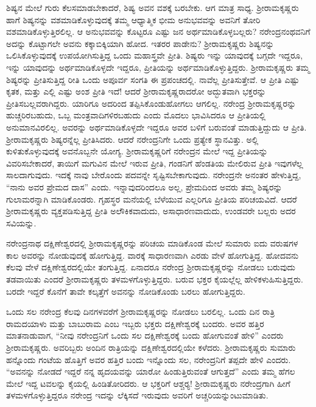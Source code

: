 ಶಿಷ್ಯನ ಮೇಲೆ ಗುರು ಕೆಲಸಮಾಡಬೇಕಾದರೆ, ಶಿಷ್ಯ ಅವನ ವಶಕ್ಕೆ ಬರಬೇಕು. ಆಗ ಮಾತ್ರ ಸಾಧ್ಯ. ಶ‍್ರೀರಾಮಕೃಷ್ಣರು ಹಾಗೆ ಶಿಷ್ಯನನ್ನು ವಶಮಾಡಿಕೊಳ್ಳುವುದಕ್ಕೆ ತಮ್ಮ ಆಧ್ಯಾತ್ಮಿಕ ಭೀಮ ಅನುಭವವನ್ನು ಅವನಿಗೆ ತೋರಿ ವಶಮಾಡಿಕೊಳ್ಳುತ್ತಿರಲಿಲ್ಲ. ಆ ಅನುಭವವನ್ನು ಕೊಟ್ಟರೂ ಎಷ್ಟು ಜನ ಅರ್ಥಮಾಡಿಕೊಳ್ಳಬಲ್ಲರು? ನರೇಂದ್ರನಂಥವನಿಗೆ ಅದನ್ನು ಕೊಟ್ಟಾಗಲೇ ಅವನು ಕಕ್ಕಾಬಿಕ್ಕಿಯಾಗಿ ಹೋದ. ಇತರರ ಪಾಡೇನು? ಶ‍್ರೀರಾಮಕೃಷ್ಣರು ಶಿಷ್ಯನನ್ನು ಒಲಿಸಿಕೊಳ್ಳುವುದಕ್ಕೆ ಉಪಯೋಗಿಸುತ್ತಿದ್ದ ಒಂದು ಮಹಾಸ್ತ್ರವೇ ಪ್ರೀತಿ. ಶಿಷ್ಯರು ಇನ್ನು ಯಾವುದಕ್ಕೆ ಬಗ್ಗದೇ ಇದ್ದರೂ, ಇನ್ನು ಯಾವುದನ್ನು ಅರ್ಥಮಾಡಿಕೊಳ್ಳದೇ ಇದ್ದರೂ, ಪ್ರೀತಿಯನ್ನು ಅರ್ಥಮಾಡಿಕೊಳ್ಳುತ್ತಿದ್ದರು. ಶ‍್ರೀರಾಮಕೃಷ್ಣರು ತಮ್ಮ ಶಿಷ್ಯರನ್ನು ಪ್ರೀತಿಸುತ್ತಿದ್ದ ರೀತಿ ಒಂದು ಅಪೂರ್ವ ಸಂಗತಿ ಈ ಪ್ರಪಂಚದಲ್ಲಿ. ನಾವೆಲ್ಲ ಪ್ರೀತಿಸುತ್ತೇವೆ. ಆ ಪ್ರೀತಿ ಎಷ್ಟು ಕೃತಕ, ಮತ್ತು ಎಲ್ಲಿ ಎಷ್ಟು ಅಂಶ ಪ್ರೀತಿ ಇದೆ! ಆದರೆ ಶ‍್ರೀರಾಮಕೃಷ್ಣರಾದರೋ ಅದ್ಭುತವಾಗಿ ಭಕ್ತರನ್ನು ಪ್ರೀತಿಸಬಲ್ಲವರಾಗಿದ್ದರು. ಯಾರಿಗೂ ಅದರಿಂದ ತಪ್ಪಿಸಿಕೊಂಡುಹೋಗಲು ಆಗಲಿಲ್ಲ. ನರೇಂದ್ರ ಶ‍್ರೀರಾಮಕೃಷ್ಣರನ್ನು ಹುಚ್ಚರಿರಬಹುದು, ಒಬ್ಬ ಮಂತ್ರವಾದಿಗಳಿರಬಹುದು ಎಂದು ಮೊದಲು ಭಾವಿಸಿದರೂ ಆ ಪ್ರೀತಿಯಲ್ಲಿ ಅನುಮಾನವಿರಲಿಲ್ಲ. ಅವರನ್ನು ಅರ್ಥಮಾಡಿಕೊಳ್ಳದೇ ಇದ್ದರೂ ಅವರ ಬಳಿಗೆ ಬರುವಂತೆ ಮಾಡುತ್ತಿದ್ದುದು ಆ ಪ್ರೀತಿ. ಶ‍್ರೀರಾಮಕೃಷ್ಣರು ಶಿಷ್ಯರನ್ನೆಲ್ಲ ಪ್ರೀತಿಸಿದರು. ಆದರೆ ನರೇಂದ್ರನಿಗೇ ಒಂದು ಪ್ರತ್ಯೇಕ ಸ್ಥಾನವಿತ್ತು. ಅಲ್ಲಿ ಕುಳಿತುಕೊಳ್ಳುವುದಕ್ಕೆ ಅವನೊಬ್ಬನೇ ಯೋಗ್ಯ. ಶ‍್ರೀರಾಮಕೃಷ್ಣರಿಗೆ ನರೇಂದ್ರನ ಮೇಲೆ ಇದ್ದ ಪ್ರೀತಿಯನ್ನು ವಿವರಿಸಬೇಕಾದರೆ, ತಾಯಿಗೆ ಮಗುವಿನ ಮೇಲೆ ಇರುವ ಪ್ರೀತಿ, ಗಂಡನಿಗೆ ಹೆಂಡತಿಯ ಮೇಲಿರುವ ಪ್ರೀತಿ ಇವುಗಳೆಲ್ಲ ಸಾಲದಾಗುವುದು. ಇದಕ್ಕೆ ನಾವು ಬೇರೊಂದು ಪದವನ್ನೇ ಸೃಷ್ಟಿಸಬೇಕಾಗುವುದು. ನರೇಂದ್ರನೇ ಅನಂತರ ಹೇಳುತ್ತಿದ್ದ, “ನಾನು ಅವರ ಪ್ರೇಮದ ದಾಸ” ಎಂದು. ಇನ್ನಾವುದರಿಂದಲೂ ಅಲ್ಲ, ಪ್ರೇಮದಿಂದ ಅವರು ತಮ್ಮ ಶಿಷ್ಯರನ್ನು ಗುಲಾಮರನ್ನಾಗಿ ಮಾಡಿಕೊಂಡರು. ಗೃಹಸ್ಥರ ಮನೆಯಲ್ಲಿ ಬೆಳೆಯುವ ಎಲ್ಲರಿಗೂ ಪ್ರೀತಿಯ ಪರಿಚಯವಿದೆ. ಆದರೆ ಶ‍್ರೀರಾಮಕೃಷ್ಣರು ವ್ಯಕ್ತಪಡಿಸುತ್ತಿದ್ದ ಪ್ರೀತಿ ಅಲೌಕಿಕವಾದುದು, ಅಸಾಧಾರಣವಾದುದು, ಉಂಡವರೇ ಬಲ್ಲರು ಅದರ ಸವಿಯನ್ನು.

ನರೇಂದ್ರನಾಥ ದಕ್ಷಿಣೇಶ್ವರದಲ್ಲಿ ಶ‍್ರೀರಾಮಕೃಷ್ಣರನ್ನು ಪರಿಚಯ ಮಾಡಿಕೊಂಡ ಮೇಲೆ ಸುಮಾರು ಐದು ವರುಷಗಳ ಕಾಲ ಅವರನ್ನು ನೋಡುವುದಕ್ಕೆ ಹೋಗುತ್ತಿದ್ದ. ವಾರಕ್ಕೆ ಸಾಧಾರಣವಾಗಿ ಎರಡು ವೇಳೆ ಹೋಗುತ್ತಿದ್ದ. ಹೋದವನು ಕೆಲವು ವೇಳೆ ದಕ್ಷಿಣೇಶ್ವರದಲ್ಲಿಯೇ ತಂಗುತ್ತಿದ್ದ. ಏನಾದರೂ ನರೇಂದ್ರ ಶ‍್ರೀರಾಮಕೃಷ್ಣರನ್ನು ನೋಡಲು ಬರುವುದು ತಡವಾಯಿತು ಎಂದರೆ ಶ‍್ರೀರಾಮಕೃಷ್ಣರು ತಳಮಳಗೊಳ್ಳುತ್ತಿದ್ದರು. ಬರುವ ಭಕ್ತರ ಕೈಯಲ್ಲೆಲ್ಲ ಹೇಳಿಕಳುಹಿಸುತ್ತಿದ್ದರು. ಬರದೇ ಇದ್ದರೆ ಕೊನೆಗೆ ತಾವೇ ಕಲ್ಕತ್ತೆಗೆ ಅವನನ್ನು ನೋಡಿಕೊಂಡು ಬರಲು ಹೋಗುತ್ತಿದ್ದರು.

ಒಂದು ಸಲ ನರೇಂದ್ರ ಕೆಲವು ದಿನಗಳವರೆಗೆ ಶ‍್ರೀರಾಮಕೃಷ್ಣರನ್ನು ನೋಡಲು ಬರಲಿಲ್ಲ. ಒಂದು ದಿನ ರಾತ್ರಿ ರಾಮದಯಾಳು ಮತ್ತು ಬಾಬುರಾಮ ಎಂಬ ಇಬ್ಬರು ಭಕ್ತರು ದಕ್ಷಿಣೇಶ್ವರಕ್ಕೆ ಬಂದರು. ಅವರ ಹತ್ತಿರ ಮಾತನಾಡುವಾಗ, “ನೀವು ನರೇಂದ್ರನಿಗೆ ಒಂದು ಸಲ ದಕ್ಷಿಣೇಶ್ವರಕ್ಕೆ ಬಂದು ಹೋಗುವಂತೆ ಹೇಳಿ” ಎಂದರು ಶ‍್ರೀರಾಮಕೃಷ್ಣರು. ಅವರಿಬ್ಬರು ಅಂದಿನ ರಾತ್ರಿಯನ್ನು ದಕ್ಷಿಣೇಶ್ವರದಲ್ಲಿಯೇ ಕಳೆದರು. ಶ‍್ರೀರಾಮಕೃಷ್ಣರು ಸುಮಾರು ಹನ್ನೊಂದು ಗಂಟೆಯ ಹೊತ್ತಿಗೆ ಅವರ ಹತ್ತಿರ ಬಂದು ಇನ್ನೊಂದು ಸಲ, ನರೇಂದ್ರನಿಗೆ ತಪ್ಪದೇ ಹೇಳಿ ಎಂದರು. “ಅವನನ್ನು ನೋಡದೆ ಇದ್ದರೆ ನನ್ನ ಹೃದಯವನ್ನು ಯಾರೋ ಹಿಂಡುತ್ತಿರುವಂತೆ ಆಗುತ್ತದೆ” ಎಂದು ತಮ್ಮ ಹೆಗಲ ಮೇಲೆ ಇದ್ದ ಟವಲನ್ನು ಕೈಯಲ್ಲಿ ಹಿಂಡಿತೋರಿದರು. ಆ ಭಕ್ತರಿಗೆ ಆಶ್ಚರ‍್ಯ! ಶ‍್ರೀರಾಮಕೃಷ್ಣರು ನರೇಂದ್ರಗಾಗಿ ಹೀಗೆ ತಳಮಳಗೊಳ್ಳುತ್ತಿದ್ದರೂ ನರೇಂದ್ರ ಇದನ್ನು ಲೆಕ್ಕಿಸದೆ ಇರುವುದು ಅವರಿಗೆ ಅಚ್ಚರಿಯನ್ನುಂಟುಮಾಡಿತು.

